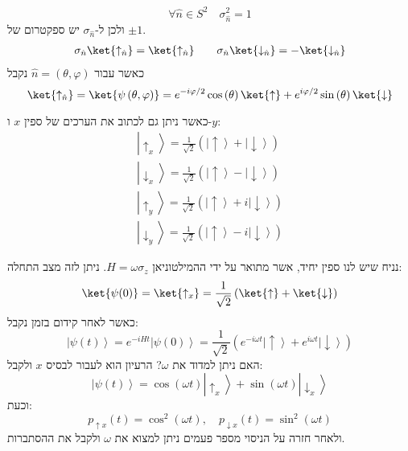\documentclass{tstextbook}
\begin{document}
\begin{proposition}
$$\forall \hat{n} \in S^{2}\quad \sigma_{\hat{n}}^{2}=1$$
ולכן ל-\(\sigma_{\hat{n}}\) יש ספקטרום של \(\pm 1\).
\begin{gather*}\sigma_{\hat{n}}\ket{\uparrow _{\hat{n}}} =\ket{\uparrow _{\hat{n}}} \qquad \sigma_{\hat{n}} \ket{\downarrow _{\hat{n}}} =-\ket{\downarrow _{\hat{n}}} 
\end{gather*}
כאשר עבור \(\hat{n}=\left( \theta,\varphi \right)\) נקבל 
$$\ket{\uparrow_{\hat{n}}}=\ket{\psi\left( \theta,\varphi \right)}=e^{ -i\varphi/2 }\cos\left( \theta \right)\ket{\uparrow}+e^{  i \varphi/2 }\sin\left( \theta \right)\ket{\downarrow } $$

\end{proposition}
\begin{proposition}[ספין x ו-y]
כאשר ניתן גם לכתוב את הערכים של ספין \(x\) ו-\(y\):
$$\begin{array}{c}{{\left|\uparrow_{x}\right\rangle=\frac{1}{\sqrt{2}}\left(\left|\uparrow\right\rangle+\left|\downarrow\right\rangle\right)}}\\ {{\left|\downarrow_{x}\right\rangle=\frac{1}{\sqrt{2}}\left(\left|\uparrow\right\rangle-\left|\downarrow\right\rangle\right)}}\\{{\left|\uparrow_{y}\right\rangle=\frac{1}{\sqrt{2}}\left(\left|\uparrow\right\rangle+i\left|\downarrow\right\rangle\right)}}\\ {{\left|\downarrow_{y}\right\rangle=\frac{1}{\sqrt{2}}\left(\left|\uparrow\right\rangle-i\left|\downarrow\right\rangle\right)}}\end{array}$$

\end{proposition}
\begin{example}
נניח שיש לנו ספין יחיד, אשר מתואר על ידי ההמילטוניאן \(H=\omega \sigma_{z}\). ניתן לזה מצב התחלה:
$$\ket{\psi(0)} =\ket{\uparrow _{x}} = \frac{1}{\sqrt{ 2 }}\left( \ket{\uparrow } +\ket{\downarrow }  \right)$$
כאשר לאחר קידום בזמן נקבל:
$$\left|\psi\left(t\right)\right\rangle=e^{-i H t}\left|\psi\left(0\right)\right\rangle=\frac{1}{\sqrt{2}}\left(e^{-i\omega t}\left|\uparrow\right\rangle+e^{i\omega t}\left|\downarrow\right\rangle\right)$$
האם ניתן למדוד את \(\omega\)? הרעיון הוא לעבור לבסיס \(x\) ולקבל:
$$\left|\psi\left(t\right)\right\rangle=\cos\left(\omega t\right)\left|\uparrow_{x}\right\rangle+\sin\left(\omega t\right)\left|\downarrow_{x}\right\rangle$$
וכעת:
$$p_{\uparrow x}\left(t\right)=\cos^{2}\left(\omega t\right),\quad p_{\downarrow x}\left(t\right)=\sin^{2}\left(\omega t\right)$$
ולאחר חזרה על הניסוי מספר פעמים ניתן למצוא את \(\omega\) ולקבל את ההסתברות.

\end{example}
\end{document}
